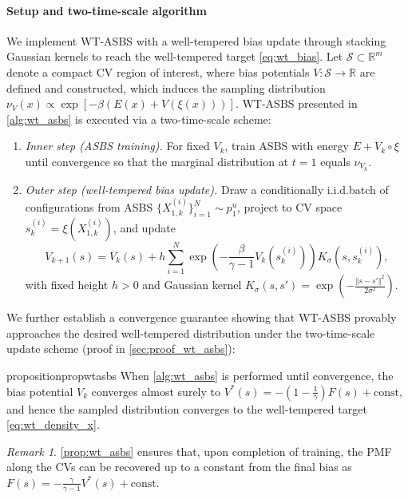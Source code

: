 \documentclass[]{fairmeta}
\theoremstyle{remark}
\newtheorem{remark}{Remark}[section]
\begin{document}
\paragraph{Setup and two-time-scale algorithm}
We implement WT-ASBS with a well-tempered bias update through stacking Gaussian kernels \citep{barducci2008well} to reach the well-tempered target \cref{eq:wt_bias}.
Let $\mathcal{S} \subset \mathbb{R}^m$ denote a compact CV region of interest, where bias potentials $V: \mathcal{S} \to \mathbb{R}$ are defined and constructed, which induces the sampling distribution $\nu_V(x) \propto \exp[{-\beta(E(x) + V(\xi(x)))}]$.
WT-ASBS presented in \cref{alg:wt_asbs} is executed via a two-time-scale scheme: 
\begin{enumerate}
\item \textit{Inner step (ASBS training).}
For fixed $V_k$, train ASBS with energy $E + V_k \circ \xi$ until convergence so that the marginal distribution at $t = 1$ equals $\nu_{V_k}$.
\item \textit{Outer step (well-tempered bias update).}
Draw a conditionally i.i.d.\@ batch of configurations from ASBS $\{X_{1,k}^{(i)}\}_{i=1}^N \sim p_1^u$, project to CV space $s_k^{(i)} = \xi(X_{1,k}^{(i)})$, and update
\begin{equation}
V_{k+1}(s) = V_k(s) + h \sum_{i=1}^N \exp{(-\frac{\beta}{\gamma - 1} V_k(s_k^{(i)}))} K_\sigma(s, s_k^{(i)}),
\end{equation}
with fixed height $h > 0$ and Gaussian kernel $K_\sigma(s, s') = \exp(-\frac{\Vert s - s' \Vert^2}{2\sigma^2})$.
\end{enumerate}

We further establish a convergence guarantee showing that WT-ASBS provably approaches the desired well-tempered distribution under the two-time-scale update scheme (proof in \cref{sec:proof_wt_asbs}):
\begin{restatable}{proposition}{propwtasbs}
\label{prop:wt_asbs}
When \cref{alg:wt_asbs} is performed until convergence, the bias potential $V_k$ converges almost surely to $V^\ast(s) = -(1 - \frac{1}{\gamma})F(s) + \mathrm{const}$, and hence the sampled distribution converges to the well-tempered target \cref{eq:wt_density_x}.
\end{restatable}

\begin{remark}
\label{remark:wt_asbs}
\cref{prop:wt_asbs} ensures that, upon completion of training, the PMF along the CVs can be recovered up to a constant from the final bias as $F(s) = -\frac{\gamma}{\gamma - 1} V^\ast(s) + \mathrm{const}$.
\end{remark}
\end{document}
